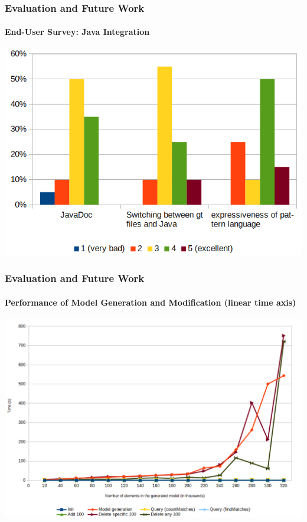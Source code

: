 	\begin{frame}
		\frametitle{Evaluation and Future Work}
		\framesubtitle{End-User Survey: Java Integration}
		\begin{center}
			\includegraphics[width=.7\linewidth]{../common/figures/evaluation-results-java-integration}
		\end{center}
	\end{frame}
	\begin{frame}
		\frametitle{Evaluation and Future Work}
		\framesubtitle{Performance of Model Generation and Modification (linear time axis)}
		\begin{center}
			\includegraphics[height=.75\textheight]{../common/figures/evaluation-runtime1}
		\end{center}
	\end{frame}
